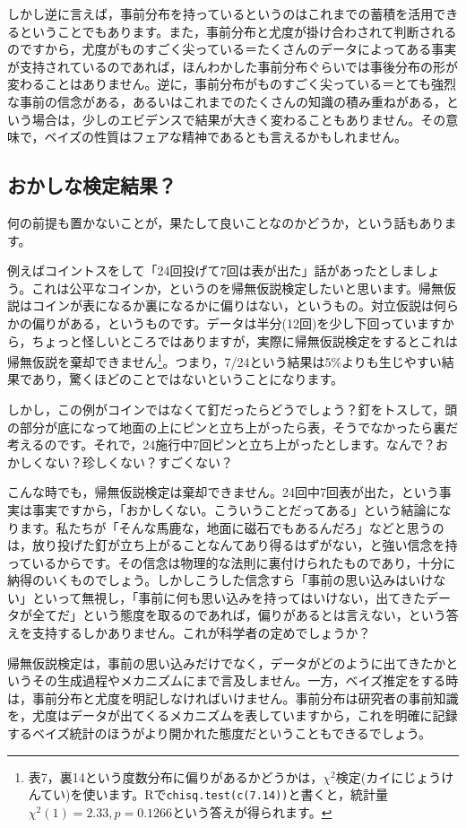 \documentclass{ltjsarticle}
\begin{document}
しかし逆に言えば，事前分布を持っているというのはこれまでの蓄積を活用できるということでもあります。また，事前分布と尤度が掛け合わされて判断されるのですから，尤度がものすごく尖っている＝たくさんのデータによってある事実が支持されているのであれば，ほんわかした事前分布ぐらいでは事後分布の形が変わることはありません。逆に，事前分布がものすごく尖っている＝とても強烈な事前の信念がある，あるいはこれまでのたくさんの知識の積み重ねがある，という場合は，少しのエビデンスで結果が大きく変わることもありません。その意味で，ベイズの性質はフェアな精神であるとも言えるかもしれません。
\subsection{おかしな検定結果？}
何の前提も置かないことが，果たして良いことなのかどうか，という話もあります\citep{Maeda2017}。

例えばコイントスをして「24回投げて7回は表が出た」話があったとしましょう。これは公平なコインか，というのを帰無仮説検定したいと思います。帰無仮説はコインが表になるか裏になるかに偏りはない，というもの。対立仮説は何らかの偏りがある，というものです。データは半分(12回)を少し下回っていますから，ちょっと怪しいところではありますが，実際に帰無仮説検定をするとこれは帰無仮説を棄却できません\footnote{表7，裏14という度数分布に偏りがあるかどうかは，$\chi^2$検定(カイにじょうけんてい)を使います。Rで\texttt{chisq.test(c(7.14))}と書くと，統計量$\chi^2(1)=2.33,p=0.1266$という答えが得られます。}。つまり，7/24という結果は5\%よりも生じやすい結果であり，驚くほどのことではないということになります。

しかし，この例がコインではなくて釘だったらどうでしょう？釘をトスして，頭の部分が底になって地面の上にピンと立ち上がったら表，そうでなかったら裏だ考えるのです。それで，24施行中7回ピンと立ち上がったとします。なんで？おかしくない？珍しくない？すごくない？

こんな時でも，帰無仮説検定は棄却できません。24回中7回表が出た，という事実は事実ですから，「おかしくない。こういうことだってある」という結論になります。私たちが「そんな馬鹿な，地面に磁石でもあるんだろ」などと思うのは，放り投げた釘が立ち上がることなんてあり得るはずがない，と強い信念を持っているからです。その信念は物理的な法則に裏付けられたものであり，十分に納得のいくものでしょう。しかしこうした信念すら「事前の思い込みはいけない」といって無視し，「事前に何も思い込みを持ってはいけない，出てきたデータが全てだ」という態度を取るのであれば，偏りがあるとは言えない，という答えを支持するしかありません。これが科学者の定めでしょうか？

帰無仮説検定は，事前の思い込みだけでなく，データがどのように出てきたかというその生成過程やメカニズムにまで言及しません。一方，ベイズ推定をする時は，事前分布と尤度を明記しなければいけません。事前分布は研究者の事前知識を，尤度はデータが出てくるメカニズムを表していますから，これを明確に記録するベイズ統計のほうがより開かれた態度だということもできるでしょう。
\end{document}
